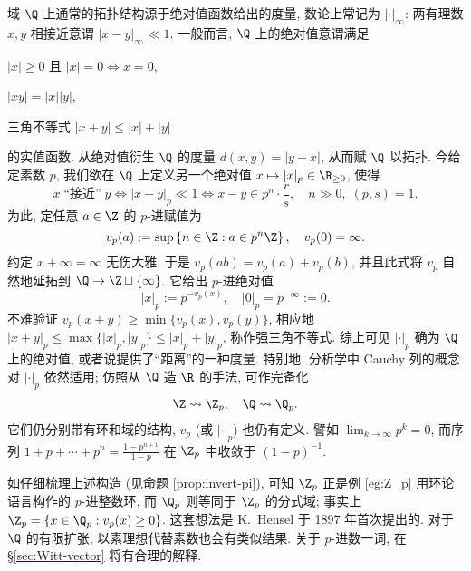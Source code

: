 \begin{example}[$p$-进数]\label{eg:p-adic-valuation} 
	域 $\Q$ 上通常的拓扑结构源于绝对值函数给出的度量, 数论上常记为 $|\cdot|_\infty$: 两有理数 $x,y$ 相接近意谓 $|x-y|_\infty \ll 1$. 一般而言, $\Q$ 上的绝对值意谓满足
	\begin{inparaenum}[(a)]
		\item $|x| \geq 0$ 且 $|x|=0 \iff x=0$,
		\item $|xy|=|x| |y|$,
		\item 三角不等式 $|x+y| \leq |x|+|y|$
	\end{inparaenum}
	的实值函数. 从绝对值衍生 $\Q$ 的度量 $d(x,y)=|y-x|$, 从而赋 $\Q$ 以拓扑. 今给定素数 $p$, 我们欲在 $\Q$ 上定义另一个绝对值 $x \mapsto |x|_p \in \R_{\geq 0}$, 使得
	\[ x \;\text{``接近''}\; y \iff |x-y|_p \ll 1 \iff x-y \in  p^n \cdot \frac{r}{s}, \quad n \gg 0, \; (p,s)=1. \]
	为此, 定任意 $a \in \Z$ 的 $p$-进赋值为
	\[ v_p(a) := \sup \left\{n \in \Z: a \in p^n \Z  \right\},\quad v_p(0) = \infty. \]
	约定 $x + \infty = \infty$ 无伤大雅, 于是 $v_p(ab) = v_p(a) + v_p(b)$, 并且此式将 $v_p$ 自然地延拓到 $\Q \to \Z \sqcup \{\infty\}$. 它给出 $p$-进绝对值
	\[ |x|_p := p^{-v_p(x)}, \quad |0|_p = p^{-\infty} := 0. \]
	不难验证 $v_p(x+y) \geq \min\{v_p(x), v_p(y)\}$, 相应地 $|x+y|_p \leq \max\{|x|_p , |y|_p\} \leq |x|_p + |y|_p$, 称作强三角不等式. 综上可见 $|\cdot|_p$ 确为 $\Q$ 上的绝对值, 或者说提供了``距离''的一种度量. 特别地, 分析学中 Cauchy 列的概念对 $|\cdot|_p$ 依然适用; 仿照从 $\Q$ 造 $\R$ 的手法, 可作完备化
	\begin{gather*}
		\Z \leadsto \Z_p, \quad	\Q \leadsto \Q_p.
	\end{gather*}
	它们仍分别带有环和域的结构, $v_p$ (或 $|\cdot|_p$) 也仍有定义. 譬如 $\lim_{k \to \infty} p^k = 0$, 而序列 $1 + p + \cdots + p^n = \frac{1 - p^{n+1}}{1 - p}$ 在 $\Z_p$ 中收敛于 $(1-p)^{-1}$.

	如仔细梳理上述构造 (见命题 \ref{prop:invert-pi}), 可知 $\Z_p$ 正是例 \ref{eg:Z_p} 用环论语言构作的 $p$-进整数环, 而 $\Q_p$ 则等同于 $\Z_p$ 的分式域; 事实上 $\Z_p = \{x \in \Q_p: v_p(x) \geq 0 \}$. 这套想法是 K.\ Hensel 于 1897 年首次提出的. 对于 $\Q$ 的有限扩张, 以素理想代替素数也会有类似结果. 关于 $p$-进数一词, 在 \S\ref{sec:Witt-vector} 将有合理的解释.
\end{example}

